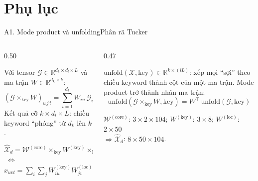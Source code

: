 \appendix
\section{Phụ lục}



\begin{frame}{A1. Mode product và unfolding}{Phân rã Tucker}
\begin{columns}[T,onlytextwidth]
\begin{column}{0.50\textwidth}
\begin{mathcard}
  \small Với tensor $\mathcal G\in\mathbb R^{d_k\times d_l\times L}$ và ma trận $W\in\mathbb R^{d_k\times k}$:
  \[
  (\mathcal G\times_{\mathrm{key}}W)_{u\,j\,t}=\sum_{i=1}^{d_k} W_{iu}\,\mathcal G_{ijt}
  \]
  Kết quả cỡ $k\times d_l\times L$: chiều keyword ``phóng'' từ $d_k$ lên $k$.
\end{mathcard}
\vspace{2mm}
\begin{mathcard}
  \small $\widehat{\mathcal X}_d=\mathcal W^{(\mathrm{core})}\times_{\mathrm{key}}W^{(\mathrm{key})}\times_{\mathrm{loc}}W^{(\mathrm{loc})}$
  $\;\Leftrightarrow\;$
  $\hat x_{uvt}=\sum_{i}\sum_{j}W^{(\mathrm{key})}_{iu}W^{(\mathrm{loc})}_{jv}\,w_{ijt}$
\end{mathcard}
\end{column}
\begin{column}{0.47\textwidth}
\begin{mathcard}
  \small $\mathrm{unfold}(\mathcal X,\mathrm{key})\in\mathbb R^{k\times (l L)}$: xếp mọi ``sợi'' theo chiều keyword thành cột của một ma trận.
  Mode product trở thành nhân ma trận:
  \[
  \mathrm{unfold}(\mathcal G\times_{\mathrm{key}}W,\mathrm{key}) = W^{\top}\,\mathrm{unfold}(\mathcal G,\mathrm{key})
  \]
\end{mathcard}
\vspace{2mm}
\begin{intuition}
  \small $\mathcal W^{(\mathrm{core})}$: $3\times2\times104$;\;
  $W^{(\mathrm{key})}$: $3\times8$;\;
  $W^{(\mathrm{loc})}$: $2\times50$\\
  $\Rightarrow\widehat{\mathcal X}_d$: $8\times50\times104$.
\end{intuition}
\end{column}
\end{columns}
\vfill
{}
\end{frame}

